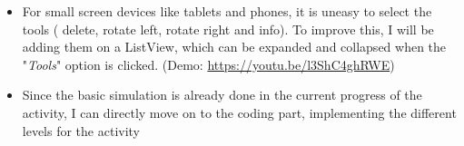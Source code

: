 \documentclass[preprint,12pt]{elsarticle}
\begin{document}
\begin{itemize}
\item For small screen devices like tablets and phones, it is uneasy to select the tools ( delete, rotate left, rotate right and info). To improve this, I will be adding them on a ListView, which can be expanded and collapsed when the "\textit{Tools}" option is clicked. (Demo: \href{https://youtu.be/l3ShC4ghRWE}{https://youtu.be/l3ShC4ghRWE})
\item Since the basic simulation is already done in the current progress of the activity, I can directly move on to the coding part, implementing the different levels for the activity
\end{itemize}











\end{document}
